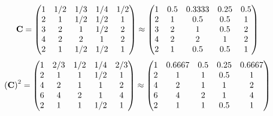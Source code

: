 \documentclass[10pt,a4paper]{article}
\begin{document}
	\[
		\bold{C} = 
		\begin{pmatrix}
			{1}{} & {1} / {{2}} & {1} / {{3}} & {1} / {{4}} & {1} / {{2}} \\
			{{2}}{} & {1}{} & {1} / {{2}} & {1} / {{2}} & {1}{} \\
			{{3}}{} & {{2}}{} & {1}{} & {1} / {{2}} & {{2}}{} \\
			{{4}}{} & {{2}}{} & {{2}}{} & {1}{} & {{2}}{} \\
			{{2}}{} & {1}{} & {1} / {{2}} & {1} / {{2}} & {1}{} \\
		\end{pmatrix}
		\approx
		\begin{pmatrix}
			1        & 0.5      & 0.3333   & 0.25     & 0.5      \\
			2        & 1        & 0.5      & 0.5      & 1        \\
			3        & 2        & 1        & 0.5      & 2        \\
			4        & 2        & 2        & 1        & 2        \\
			2        & 1        & 0.5      & 0.5      & 1        \\
		\end{pmatrix}
	\]
	\[
		\left(\bold{C}\right)^{2} = 
		\begin{pmatrix}
			{1}{} & {{2}} / {{3}} & {1} / {{2}} & {1} / {{4}} & {{2}} / {{3}} \\
			{{2}}{} & {1}{} & {1}{} & {1} / {{2}} & {1}{} \\
			{{4}}{} & {{2}}{} & {1}{} & {1}{} & {{2}}{} \\
			{{6}}{} & {{4}}{} & {{2}}{} & {1}{} & {{4}}{} \\
			{{2}}{} & {1}{} & {1}{} & {1} / {{2}} & {1}{} \\
		\end{pmatrix}
		\approx
		\begin{pmatrix}
			1        & 0.6667   & 0.5      & 0.25     & 0.6667   \\
			2        & 1        & 1        & 0.5      & 1        \\
			4        & 2        & 1        & 1        & 2        \\
			6        & 4        & 2        & 1        & 4        \\
			2        & 1        & 1        & 0.5      & 1        \\
		\end{pmatrix}
	\]
\end{document}
